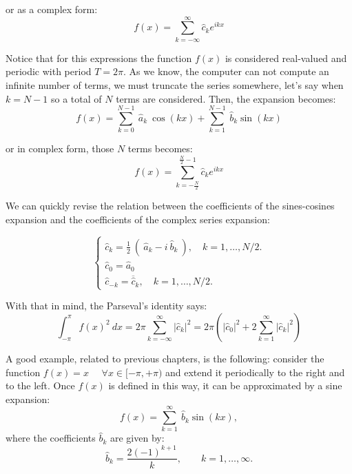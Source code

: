 or as a complex form:
\begin{equation} 
    f ( x)  =  \sum_{k=-\infty} ^{\infty}  \hat{c}_k  e^{ i k x }
\end{equation} 

Notice that for this expressions the function $f(x)$ is considered real-valued and periodic with period $T=2\pi$. As we know, the computer can not compute an infinite number of terms, we must truncate the series somewhere, let's say when $k = N-1$ so a total of $N$ terms are considered. Then, the expansion becomes:
\begin{equation} 
    f ( x)  =  \sum_{k=0} ^{N-1} \  \hat{a}_k  \ \cos\left(k x\right) + \sum_{k=1} ^{N-1} \  \hat{b}_k  \sin \left(k x\right)
\end{equation}

or in complex form, those $N$ terms becomes:
\begin{equation} 
    f ( x)  =  \sum_{k=-\frac{N}{2}} ^{\frac{N}{2}-1}  \hat{c}_k  e^{ i k x }
\end{equation} 

We can quickly revise the relation between the coefficients of the sines-cosines expansion and the coefficients of the complex series expansion:  

$$
\begin{cases}
    \hat{c}_k  =  \frac{1}{2} \ ( \ \hat{a}_k  - i \ \hat{b}_k \ ),  \quad k=1, \ldots, N/2.   \\
    \hat{c}_0  = \hat{a}_0   \\
    \hat{c}_{-k}  =  \overline{ \hat{c} } _{k}  , \quad k=1, \ldots, N/2. 
\end{cases}
$$

With that in mind, the Parseval's identity says:
\begin{equation} 
	\int _{-\pi} ^{\pi} f(x)^2 \ dx =  2 \pi  \sum_{k=-\infty} ^{\infty}  | \hat{c}_k | ^2       =  2 \pi \left(    | \hat{c}_0 |^2 + 2 \sum_{k=1} ^{\infty} |  \hat{c}_k  |^2 \right) 
\end{equation} 





A good example, related to previous chapters, is the following: consider the function $ f(x) = x \quad $ $ \forall x \in [-\pi, +\pi ) $ and extend it periodically to the right and to the left. Once $ f(x) $ is defined in this way, it can be approximated by a sine expansion: 
\begin{equation} 
	f ( x )  =  \sum_{k=1} ^{\infty} \   \hat{b}_k  \sin \left(  kx\right), 
\end{equation} 
where the coefficients $ \hat{b}_k $ are given by:
\begin{equation} 
    \hat{b}_k   = \frac{ 2 (-1)^{k+1} }{ k }, \qquad k=1, \ldots,\infty. 
\end{equation} 

